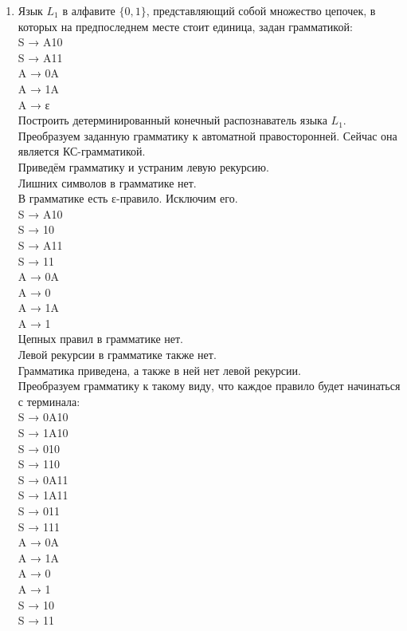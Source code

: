 \documentclass[a4paper,14pt]{extarticle}
\begin{document}
\begin{enumerate}[1.]
    \item Язык $L_1$ в алфавите $\{0,1\}$, представляющий собой множество цепочек, в которых на предпоследнем месте стоит единица, задан грамматикой:\\
    S → A10\\
    S → A11\\
    A → 0A\\
    A → 1A\\
    A → ε\\
    Построить детерминированный конечный распознаватель языка $L_1$.\bigbreak
    Преобразуем заданную грамматику к автоматной правосторонней. Сейчас она является КС-грамматикой.\\
    Приведём грамматику и устраним левую рекурсию.\\
    Лишних символов в грамматике нет.\\
    В грамматике есть ε-правило. Исключим его.\\
    S → A10\\
    S → 10\\
    S → A11\\
    S → 11\\
    A → 0A\\
    A → 0\\
    A → 1A\\
    A → 1\\
    Цепных правил в грамматике нет.\\
    Левой рекурсии в грамматике также нет.\\
    Грамматика приведена, а также в ней нет левой рекурсии.\\ 
    Преобразуем грамматику к такому виду, что каждое 
    правило будет начинаться с терминала:\\ 

S → 0A10\\
S → 1A10\\
S → 010\\
S → 110\\
S → 0A11\\
S → 1A11\\
S → 011\\
S → 111\\
A → 0A\\
A → 1A\\
A → 0\\
A → 1\\
S → 10\\
S → 11\\


\end{enumerate}
\end{document}
